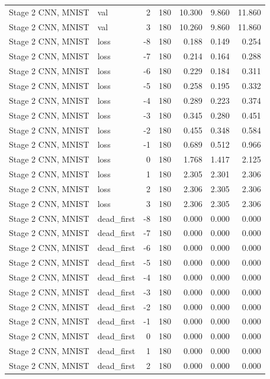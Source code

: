 \begin{table}[htbp]
{\begin{tabular}{@{}llrrrrr@{}}
Stage 2 CNN, MNIST & val & 2 & 180 & 10.300 & 9.860 & 11.860 \\
Stage 2 CNN, MNIST & val & 3 & 180 & 10.260 & 9.860 & 11.860 \\
Stage 2 CNN, MNIST & loss & -8 & 180 & 0.188 & 0.149 & 0.254 \\
Stage 2 CNN, MNIST & loss & -7 & 180 & 0.214 & 0.164 & 0.288 \\
Stage 2 CNN, MNIST & loss & -6 & 180 & 0.229 & 0.184 & 0.311 \\
Stage 2 CNN, MNIST & loss & -5 & 180 & 0.258 & 0.195 & 0.332 \\
Stage 2 CNN, MNIST & loss & -4 & 180 & 0.289 & 0.223 & 0.374 \\
Stage 2 CNN, MNIST & loss & -3 & 180 & 0.345 & 0.280 & 0.451 \\
Stage 2 CNN, MNIST & loss & -2 & 180 & 0.455 & 0.348 & 0.584 \\
Stage 2 CNN, MNIST & loss & -1 & 180 & 0.689 & 0.512 & 0.966 \\
Stage 2 CNN, MNIST & loss & 0 & 180 & 1.768 & 1.417 & 2.125 \\
Stage 2 CNN, MNIST & loss & 1 & 180 & 2.305 & 2.301 & 2.306 \\
Stage 2 CNN, MNIST & loss & 2 & 180 & 2.306 & 2.305 & 2.306 \\
Stage 2 CNN, MNIST & loss & 3 & 180 & 2.306 & 2.305 & 2.306 \\
Stage 2 CNN, MNIST & dead\_first & -8 & 180 & 0.000 & 0.000 & 0.000 \\
Stage 2 CNN, MNIST & dead\_first & -7 & 180 & 0.000 & 0.000 & 0.000 \\
Stage 2 CNN, MNIST & dead\_first & -6 & 180 & 0.000 & 0.000 & 0.000 \\
Stage 2 CNN, MNIST & dead\_first & -5 & 180 & 0.000 & 0.000 & 0.000 \\
Stage 2 CNN, MNIST & dead\_first & -4 & 180 & 0.000 & 0.000 & 0.000 \\
Stage 2 CNN, MNIST & dead\_first & -3 & 180 & 0.000 & 0.000 & 0.000 \\
Stage 2 CNN, MNIST & dead\_first & -2 & 180 & 0.000 & 0.000 & 0.000 \\
Stage 2 CNN, MNIST & dead\_first & -1 & 180 & 0.000 & 0.000 & 0.000 \\
Stage 2 CNN, MNIST & dead\_first & 0 & 180 & 0.000 & 0.000 & 0.000 \\
Stage 2 CNN, MNIST & dead\_first & 1 & 180 & 0.000 & 0.000 & 0.000 \\
Stage 2 CNN, MNIST & dead\_first & 2 & 180 & 0.000 & 0.000 & 0.000 \\

\end{tabular}}
\end{table}
